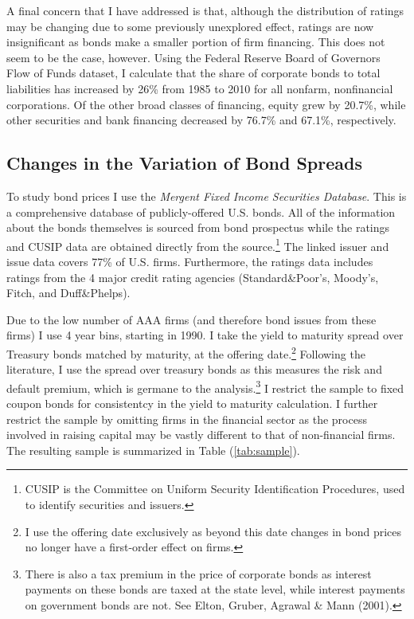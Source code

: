 \documentclass[titlepage]{article}
\begin{document}
A final concern that I have addressed is that, although the distribution of ratings may be changing due to some previously unexplored effect, ratings are now insignificant as bonds make a smaller portion of firm financing. This does not seem to be the case, however. Using the Federal Reserve Board of Governors Flow of Funds dataset, I calculate that the share of corporate bonds to total liabilities has increased by 26\% from 1985 to 2010 for all nonfarm, nonfinancial corporations. Of the other broad classes of financing, equity grew by 20.7\%, while other securities and bank financing decreased by 76.7\% and 67.1\%, respectively.

\subsection{Changes in the Variation of Bond Spreads}
To study bond prices I use the \textit{Mergent Fixed Income Securities Database}. This is a comprehensive database of publicly-offered U.S. bonds. All of the information about the bonds themselves is sourced from bond prospectus while the ratings and CUSIP data are obtained directly from the source.\footnote{CUSIP is the Committee on Uniform Security Identification Procedures, used to identify securities and issuers.} The linked issuer and issue data covers 77\% of U.S. firms. Furthermore, the ratings data includes ratings from the 4 major credit rating agencies (Standard\&Poor's, Moody's, Fitch, and Duff\&Phelps). 

Due to the low number of AAA firms (and therefore bond issues from these firms) I use 4 year bins, starting in 1990. I take the yield to maturity spread over Treasury bonds matched by maturity, at the offering date.\footnote{I use the offering date exclusively as beyond this date changes in bond prices no longer have a first-order effect on firms.} Following the literature, I use the spread over treasury bonds as this measures the risk and default premium, which is germane to the analysis.\footnote{There is also a tax premium in the price of corporate bonds as interest payments on these bonds are taxed at the state level, while interest payments on government bonds are not. See Elton, Gruber, Agrawal \& Mann (2001).}  I restrict the sample to fixed coupon bonds for consistentcy in the yield to maturity calculation. I further restrict the sample by omitting firms in the financial sector as the process involved in raising capital may be vastly different to that of non-financial firms. The resulting sample is summarized in Table (\ref{tab:sample}). 
\end{document}
